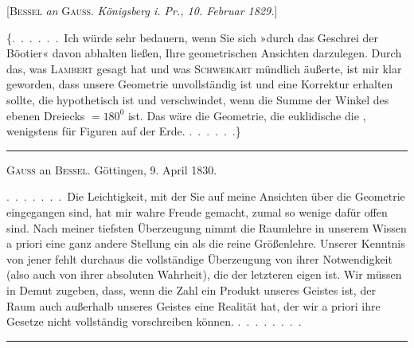 \begin{center}
[\textsc{Bessel} \emph{an} \textsc{Gauss}. \emph{Königsberg i. Pr., 10. Februar 1829.}]
\end{center}

\{.\ .\ .\ .\ .\ .\ Ich würde sehr bedauern, wenn Sie sich »durch das Geschrei der
Böotier« davon abhalten ließen, Ihre geometrischen Ansichten darzulegen.
Durch das, was \textsc{Lambert} gesagt hat und was \textsc{Schweikart} mündlich äußerte,
ist mir klar geworden, dass unsere Geometrie unvollständig ist und eine Korrektur erhalten sollte, die hypothetisch ist und verschwindet, wenn die Summe der
Winkel des ebenen Dreiecks $=180^{0}$ ist. Das wäre die 
Geometrie, die euklidische die , wenigstens für Figuren auf der
Erde. .\ .\ .\ .\ .\ .\}

\rule{4cm}{0.5pt}

\begin{center}
\textsc{Gauss} an \textsc{Bessel}. Göttingen, 9. April 1830.
\end{center}

.\ .\ .\ .\ .\ .\ .\ Die Leichtigkeit, mit der Sie auf meine Ansichten über die Geometrie
eingegangen sind, hat mir wahre Freude gemacht, zumal so wenige
dafür offen sind. Nach meiner tiefsten Überzeugung nimmt die Raumlehre in unserem Wissen a priori eine ganz andere Stellung ein als die reine
Größenlehre. Unserer Kenntnis von jener fehlt durchaus die vollständige Überzeugung von ihrer Notwendigkeit (also auch von ihrer absoluten
Wahrheit), die der letzteren eigen ist. Wir müssen in Demut zugeben,
dass, wenn die Zahl  ein Produkt unseres Geistes ist, der Raum auch außerhalb
unseres Geistes eine Realität hat, der wir a priori ihre Gesetze nicht vollständig vorschreiben können. .\ .\ .\ .\ .\ .\ .\ .

\rule{4cm}{0.5pt}

